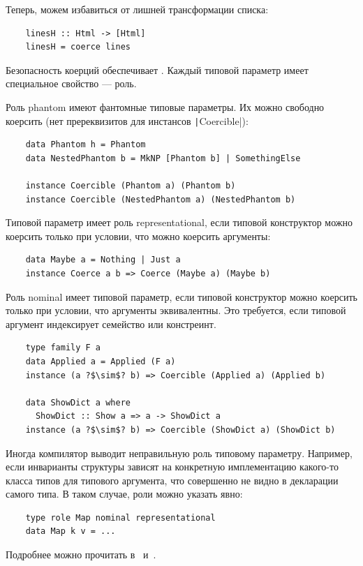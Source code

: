 Теперь, можем избавиться от лишней трансформации списка:
\begin{verbatim}
    linesH :: Html -> [Html]
    linesH = coerce lines
\end{verbatim}

Безопасность коерций обеспечивает .
Каждый типовой параметр имеет специальное свойство --- роль.

Роль phantom имеют фантомные типовые параметры.
Их можно свободно коерсить (нет пререквизитов для инстансов \texttt|Coercible|):
\begin{verbatim}
    data Phantom h = Phantom
    data NestedPhantom b = MkNP [Phantom b] | SomethingElse

    instance Coercible (Phantom a) (Phantom b)
    instance Coercible (NestedPhantom a) (NestedPhantom b)
\end{verbatim}

Типовой параметр имеет роль representational, если типовой конструктор можно коерсить только при условии, что можно коерсить аргументы:
\begin{verbatim}
    data Maybe a = Nothing | Just a
    instance Coerce a b => Coerce (Maybe a) (Maybe b)
\end{verbatim}

Роль nominal имеет типовой параметр, если типовой конструктор можно коерсить только при условии, что аргументы эквивалентны.
Это требуется, если типовой аргумент индексирует семейство или констреинт.
\begin{verbatim}
    type family F a
    data Applied a = Applied (F a)
    instance (a ?$\sim$? b) => Coercible (Applied a) (Applied b)

    data ShowDict a where
      ShowDict :: Show a => a -> ShowDict a
    instance (a ?$\sim$? b) => Coercible (ShowDict a) (ShowDict b)
\end{verbatim}

Иногда компилятор выводит неправильную роль типовому параметру.
Например, если инварианты структуры зависят на конкретную имплементацию какого-то класса типов для типового аргумента, что совершенно не видно в декларации самого типа.
В таком случае, роли можно указать явно:
\begin{verbatim}
    type role Map nominal representational
    data Map k v = ...
\end{verbatim}

Подробнее можно прочитать в~\cite{breitner2014safe} и~\cite[глава 8]{maguire-types}.

